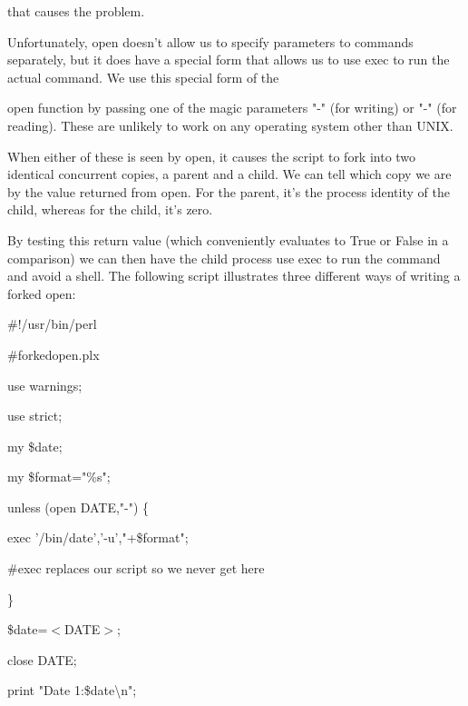 \documentclass[a4paper,11pt]{book}
\begin{document}
\noindent that causes the problem.

\noindent 

\noindent Unfortunately, open doesn't allow us to specify parameters to commands separately, but it does have a special form that allows us to use exec to run the actual command. We use this special form of the

\noindent open function by passing one of the magic parameters "\textbar -" (for writing) or "-\textbar " (for reading). These are unlikely to work on any operating system other than UNIX.

\noindent 

\noindent When either of these is seen by open, it causes the script to fork into two identical concurrent copies, a parent and a child. We can tell which copy we are by the value returned from open. For the parent, it's the process identity of the child, whereas for the child, it's zero.

\noindent 

\noindent By testing this return value (which conveniently evaluates to True or False in a comparison) we can then have the child process use exec to run the command and avoid a shell. The following script illustrates three different ways of writing a forked open:

\noindent 

\noindent \#!/usr/bin/perl

\noindent \#forkedopen.plx

\noindent use warnings;

\noindent use strict;

\noindent 

\noindent my \$date;

\noindent my \$format="\%s";

\noindent 

\noindent unless (open DATE,"-\textbar ") \{

\noindent exec '/bin/date','-u',"+\$format";

\noindent \#exec replaces our script so we never get here

\noindent \}

\noindent 

\noindent 

\noindent \$date=$<$DATE$>$;

\noindent close DATE;

\noindent print "Date 1:\$date\textbackslash n";

\noindent 
\end{document}
